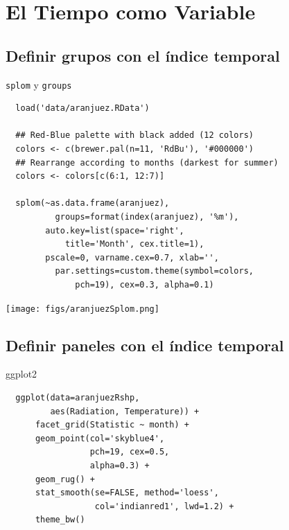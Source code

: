 \documentclass[xcolor={usenames,svgnames,dvipsnames}]{beamer}
\begin{document}
\section{El Tiempo como Variable}
\label{sec-4}

\subsection{Definir grupos con el índice temporal}
\label{sec-4-1}

\begin{frame}[fragile,label=sec-4-1-1]{\texttt{splom} y \texttt{groups}}
 \lstset{language=R,label= ,caption= ,numbers=none}
\begin{lstlisting}
  load('data/aranjuez.RData')
  
  ## Red-Blue palette with black added (12 colors)
  colors <- c(brewer.pal(n=11, 'RdBu'), '#000000')
  ## Rearrange according to months (darkest for summer)
  colors <- colors[c(6:1, 12:7)]
  
  splom(~as.data.frame(aranjuez),
          groups=format(index(aranjuez), '%m'),
        auto.key=list(space='right', 
            title='Month', cex.title=1),
        pscale=0, varname.cex=0.7, xlab='',
          par.settings=custom.theme(symbol=colors,
              pch=19), cex=0.3, alpha=0.1)
\end{lstlisting}
\end{frame}

\begin{frame}[label=sec-4-1-2]{}
\texttt{[image: figs/aranjuezSplom.png]}
\end{frame}




\subsection{Definir paneles con el índice temporal}
\label{sec-4-2}

\begin{frame}[fragile,label=sec-4-2-1]{ggplot2}
 \lstset{language=R,label= ,caption= ,numbers=none}
\begin{lstlisting}
  ggplot(data=aranjuezRshp,
         aes(Radiation, Temperature)) +
      facet_grid(Statistic ~ month) +
      geom_point(col='skyblue4',
                 pch=19, cex=0.5,
                 alpha=0.3) +
      geom_rug() +
      stat_smooth(se=FALSE, method='loess',
                  col='indianred1', lwd=1.2) +
      theme_bw()
\end{lstlisting}
\end{frame}
\end{document}
